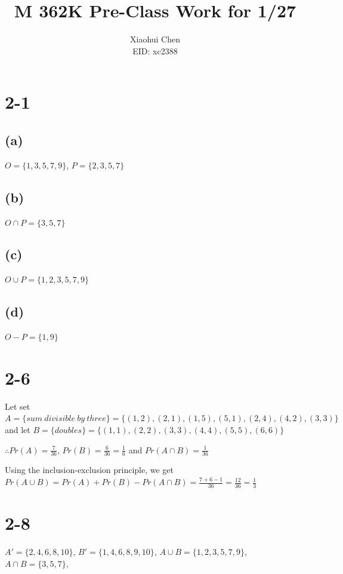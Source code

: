 \documentclass[12pt]{article}
\author{Xiaohui Chen \\EID: xc2388}
\title{M 362K Pre-Class Work for 1/27}
\begin{document}
\maketitle
\begin{spacing}{2.0}

\section*{2-1}
\subsection*{(a)}
$O=\{1,3,5,7,9\}$, $P=\{2,3,5,7\}$

\subsection*{(b)}

$O\cap P = \{3,5,7\}$

\subsection*{(c)}

$O\cup P = \{1,2,3,5,7,9\}$

\subsection*{(d)}

$O-P=\{1,9\}$

\section*{2-6}

Let set $A=\{sum\ divisible\ by\ three\} = \{(1,2),(2,1),(1,5),(5,1),(2,4),(4,2),(3,3)\}$ and let $B= \{doubles\}= \{(1,1),(2,2),(3,3),(4,4),(5,5),(6,6)\} $

$\therefore Pr(A)=\frac{7}{36}$, $Pr(B)=\frac{6}{36}=\frac{1}{6}$ and $Pr(A \cap B)=\frac{1}{36}$

Using the inclusion-exclusion principle, we get $Pr(A\cup B)= Pr(A)+Pr(B)-Pr(A \cap B)= \frac{7+6-1}{36}=\frac{12}{36}= \frac{1}{3}$

\section*{2-8}

$A'=\{2,4,6,8,10\}$, $B'=\{1,4,6,8,9,10\}$, $A\cup B =\{1,2,3,5,7,9\}$, $A\cap B= \{3,5,7\},$


\end{spacing}
\end{document}
